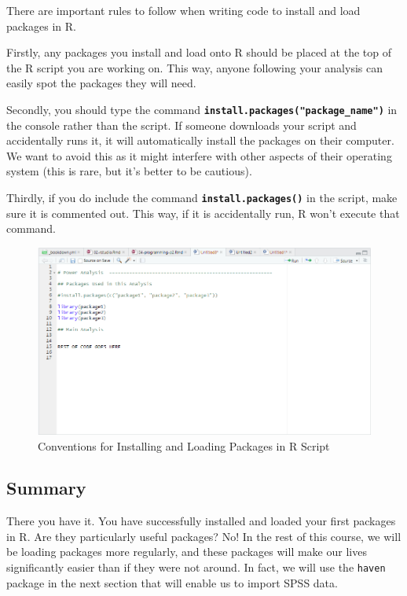 \documentclass[
]{book}
\begin{document}
There are important rules to follow when writing code to install and load packages in R.

Firstly, any packages you install and load onto R should be placed at the top of the R script you are working on. This way, anyone following your analysis can easily spot the packages they will need.

Secondly, you should type the command \textbf{\texttt{install.packages("package\_name")}} in the console rather than the script. If someone downloads your script and accidentally runs it, it will automatically install the packages on their computer. We want to avoid this as it might interfere with other aspects of their operating system (this is rare, but it's better to be cautious).

Thirdly, if you do include the command \textbf{\texttt{install.packages()}} in the script, make sure it is commented out. This way, if it is accidentally run, R won't execute that command.

\begin{figure}
\centering
\includegraphics{img/04-packages-convention.png}
\caption{\label{fig:unnamed-chunk-159}Conventions for Installing and Loading Packages in R Script}
\end{figure}

\hypertarget{summary-3}{%
\subsection{Summary}\label{summary-3}}

There you have it. You have successfully installed and loaded your first packages in R. Are they particularly useful packages? No! In the rest of this course, we will be loading packages more regularly, and these packages will make our lives significantly easier than if they were not around. In fact, we will use the \texttt{haven} package in the next section that will enable us to import SPSS data.
\end{document}
